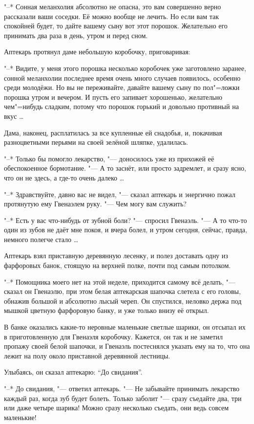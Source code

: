 "--* Сонная меланхолия абсолютно не опасна, это вам совершенно верно рассказали
ваши соседки.
Её можно вообще не лечить.
Но если вам так спокойней будет, то дайте вашему сыну вот этот порошок.
Желательно его принимать два раза в день, утром и перед сном.

Аптекарь протянул даме небольшую коробочку, приговаривая:

"--* Видите, у меня этого порошка несколько коробочек уже заготовлено заранее,
сонной меланхолии последнее время очень много случаев появилось, особенно среди
молодёжи.
Но вы не переживайте, давайте вашему сыну по пол"=ложки порошка утром и
вечером.
И пусть его запивает хорошенько, желательно чем"=нибудь сладким, потому что
порошок горький и довольно противный на вкус \ldots

Дама, наконец, расплатилась за все купленные ей снадобья, и, покачивая
разноцветными перьями на своей зелёной шляпке, удалилась.

"--* Только бы помогло лекарство, "--- доносилось уже из прихожей её
обеспокоенное бормотание.
"--- А то заснёт, или просто задремлет, и сразу ясно, что он не здесь, а где-то
очень далеко \ldots

"--* Здравствуйте, давно вас не видел, "--- сказал аптекарь и энергично пожал
протянутую ему Гвенаэлем руку.
"--- Чем могу вам служить?

"--* Есть у вас что-нибудь от зубной боли? "--- спросил Гвенаэль.
"--- А то что-то один из зубов не даёт мне покоя, и вчера болел, и утром сегодня,
сейчас, правда, немного полегче стало \ldots

Аптекарь взял приставную деревянную лесенку, и полез доставать одну из
фарфоровых банок, стоящую на верхней полке, почти под самым потолком.

"--* Помощника моего нет на этой неделе, приходится самому всё делать, "---
сказал он Гвенаэлю, при этом белая аптекарская шапочка слетела с его головы,
обнажив большой и абсолютно лысый череп.
Он спустился, неловко держа под мышкой цветную фарфоровую банку, и уже только
внизу её открыл.

В банке оказались какие-то неровные маленькие светлые шарики, он отсыпал их в
приготовленную для Гвенаэля коробочку.
Кажется, он так и не заметил пропажу своей белой шапочки, и Гвенаэль постеснялся
указать ему на то, что она лежит на полу около приставной деревянной лестницы.

Улыбаясь, он сказал аптекарю: \enquote{До свидания}.

"--* До свидания, "--- ответил аптекарь.
"--- Не забывайте принимать лекарство каждый раз, когда зуб будет болеть.
Только заболит "--- сразу съедайте два, три или даже четыре шарика!
Можно сразу несколько съедать, они ведь совсем маленькие!

